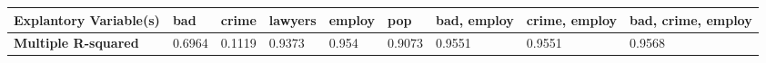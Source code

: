 \documentclass[]{article}
\begin{document}
\begin{longtable}[]{@{}lllllllll@{}}
\toprule
\begin{minipage}[b]{0.15\columnwidth}\raggedright
\textbf{Explantory Variable(s)}\strut
\end{minipage} & \begin{minipage}[b]{0.06\columnwidth}\raggedright
bad\strut
\end{minipage} & \begin{minipage}[b]{0.06\columnwidth}\raggedright
crime\strut
\end{minipage} & \begin{minipage}[b]{0.07\columnwidth}\raggedright
lawyers\strut
\end{minipage} & \begin{minipage}[b]{0.06\columnwidth}\raggedright
employ\strut
\end{minipage} & \begin{minipage}[b]{0.06\columnwidth}\raggedright
pop\strut
\end{minipage} & \begin{minipage}[b]{0.09\columnwidth}\raggedright
bad, employ\strut
\end{minipage} & \begin{minipage}[b]{0.11\columnwidth}\raggedright
crime, employ\strut
\end{minipage} & \begin{minipage}[b]{0.11\columnwidth}\raggedright
bad, crime, employ\strut
\end{minipage}\tabularnewline
\midrule
\endhead
\begin{minipage}[t]{0.15\columnwidth}\raggedright
\textbf{Multiple R-squared}\strut
\end{minipage} & \begin{minipage}[t]{0.06\columnwidth}\raggedright
0.6964\strut
\end{minipage} & \begin{minipage}[t]{0.06\columnwidth}\raggedright
0.1119\strut
\end{minipage} & \begin{minipage}[t]{0.07\columnwidth}\raggedright
0.9373\strut
\end{minipage} & \begin{minipage}[t]{0.06\columnwidth}\raggedright
0.954\strut
\end{minipage} & \begin{minipage}[t]{0.06\columnwidth}\raggedright
0.9073\strut
\end{minipage} & \begin{minipage}[t]{0.09\columnwidth}\raggedright
0.9551\strut
\end{minipage} & \begin{minipage}[t]{0.11\columnwidth}\raggedright
0.9551\strut
\end{minipage} & \begin{minipage}[t]{0.11\columnwidth}\raggedright
0.9568\strut
\end{minipage}\tabularnewline
\bottomrule
\end{longtable}
\end{document}
